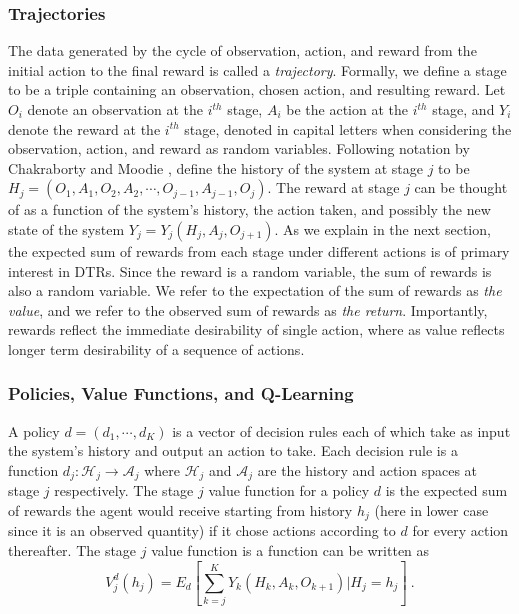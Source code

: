 \subsubsection{Trajectories}

The data generated by the cycle of observation, action, and reward from the initial action to the final reward is called a \textit{trajectory}. Formally, we define a stage to be a triple containing an observation, chosen action, and resulting reward. Let $O_i$ denote an observation at the $i^{th}$ stage, $ A_i $ be the action at the $ i^{th} $ stage, and $ Y_i $ denote the reward at the $ i^{th}$ stage, denoted in capital letters when considering the observation, action, and reward as random variables. Following notation by Chakraborty and Moodie \cite{chakraborty2013statistical},  define the history of the system at stage $j$ to be $ H_j = (O_1, A_1, O_2, A_2, \cdots , O_{j-1}, A_{j-1}, O_j) $.  The reward at stage $j$ can be thought of as a function of the system’s history, the action taken, and possibly the new state of the system $ Y_j = Y_j(H_j, A_j, O_{j+1}) $.  As we explain in the next section, the expected sum of rewards from each stage under different actions is of primary interest in DTRs.  Since the reward is a random variable, the sum of rewards is also a random variable.  We refer to the expectation of the sum of rewards as \textit{the value}, and we refer to the observed sum of rewards as \textit{the return}. Importantly, rewards reflect the immediate desirability of single action, where as value reflects longer term desirability of a sequence of actions.

\subsubsection{Policies, Value Functions, and Q-Learning}

A policy $ d = (d_1, \cdots, d_K) $ is a vector of decision rules each of which take as input the system’s history and output an action to take.  Each decision rule is a function $d_j : \mathcal{H}_j \to \mathcal{A}_j$ where $\mathcal{H}_j$ and $\mathcal{A}_j$ are the history and action spaces at stage $j$ respectively.  The stage $ j $ value function for a policy $ d $ is the expected sum of rewards the agent would receive starting from history $ h_j  $ (here in lower case since it is an observed quantity) if it chose actions according to $ d $ for every action thereafter.  The stage $j$ value function is a function can be written as
\begin{equation}
	V^d_j(h_j) = E_d\left[ \sum_{k=j}^K Y_k(H_k, A_k, O_{k+1}) \Bigg\lvert H_j = h_j\right] \>.
\end{equation}

